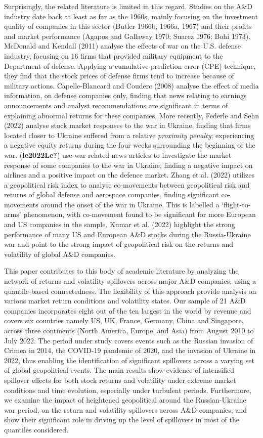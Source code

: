 \documentclass[
  letterpaper,
  DIV=11,
  numbers=noendperiod]{scrartcl}
\begin{document}
Surprisingly, the related literature is limited in this regard. Studies
on the A\&D industry date back at least as far as the 1960s, mainly
focusing on the investment quality of companies in this sector (Butler
1966b, 1966a, 1967) and their profits and market performance (Agapos and
Gallaway 1970; Suarez 1976; Bohi 1973). McDonald and Kendall (2011)
analyse the effects of war on the U.S. defense industry, focusing on 16
firms that provided military equipment to the Department of defense.
Applying a cumulative prediction error (CPE) technique, they find that
the stock prices of defense firms tend to increase because of military
actions. Capelle‐Blancard and Couderc (2008) analyse the effect of media
information, on defense companies only, finding that news relating to
earnings announcements and analyst recommendations are significant in
terms of explaining abnormal returns for these companies. More recently,
Federle and Sehn (2022) analyse stock market responses to the war in
Ukraine, finding that firms located closer to Ukraine suffered from a
relative \emph{proximity penalty}; experiencing a negative equity
returns during the four weeks surrounding the beginning of the war.
(\textbf{le2022Le?}) use war-related news articles to investigate the
market response of some companies to the war in Ukraine, finding a
negative impact on airlines and a positive impact on the defence market.
Zhang et al. (2022) utilizes a geopolitical risk index to analyse
co-movements between geopolitical risk and returns of global defense and
aerospace companies, finding significant co-movements around the onset
of the war in Ukraine. This is labelled a `flight-to-arms' phenomenon,
with co-movement found to be significant for more European and US
companies in the sample. Kumar et al. (2022) highlight the strong
performance of many US and European A\&D stocks during the
Russia-Ukraine war and point to the strong impact of geopolitical risk
on the returns and volatility of global A\&D companies.

This paper contributes to this body of academic literature by analyzing
the network of returns and volatility spillovers across major A\&D
companies, using a quantile-based connectedness. The flexibility of this
approach provide analysis on various market return conditions and
volatility states. Our sample of 21 A\&D companies incorporates eight
out of the ten largest in the world by revenue and covers six countries
namely US, UK, France, Germany, China and Singapore, across three
continents (North America, Europe, and Asia) from August 2010 to July
2022. The period under study covers events such as the Russian invasion
of Crimea in 2014, the COVID-19 pandemic of 2020, and the invasion of
Ukraine in 2022, thus enabling the identification of significant
spillovers across a varying set of global geopolitical events. The main
results show evidence of intensified spillover effects for both stock
returns and volatility under extreme market conditions and time
evolution, especially under turbulent periods. Furthermore, we examine
the impact of heightened geopolitical around the Russian-Ukraine war
period, on the return and volatility spillovers across A\&D companies,
and show their significant role in driving up the level of spillovers in
most of the quantiles considered.
\end{document}
